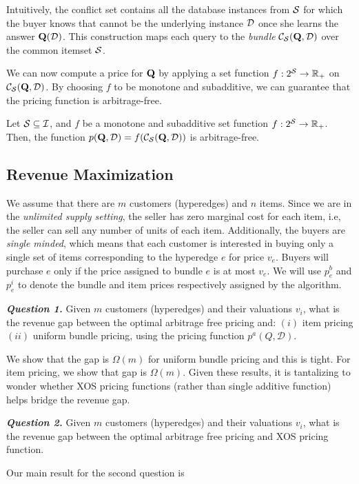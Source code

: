 Intuitively, the conflict set contains all the database instances from $\mathcal{S}$ for which the buyer knows that cannot be the underlying instance $\mathcal{D}$ once she learns the answer $\mathbf{Q}(\mathcal{D})$. This construction maps each query to the {\em  bundle} ${\mathcal{C}}_{\mathcal{S}}(\mathbf{Q},\mathcal{D}) $ over the common itemset $\mathcal{S}$.

We can now compute a price for $\mathbf{Q}$ by applying a set function $f: 2^{\mathcal{S}} \rightarrow  \mathbb{R}_+$ on ${\mathcal{C}}_{\mathcal{S}}(\mathbf{Q}, \mathcal{D})$. 
By choosing $f$ to be monotone and subadditive, we can guarantee that the pricing function is arbitrage-free.

\begin{theorem} \label{cor:arbitrage}
Let $\mathcal{S} \subseteq \mathcal{I}$, and $f$ be a monotone and subadditive set function $f: 2^{\mathcal{S}} \rightarrow  \mathbb{R}_+$. Then, the function $p(\mathbf{Q}, \mathcal{D}) = f({\mathcal{C}}_{\mathcal{S}}(\mathbf{Q}, \mathcal{D}))$ is arbitrage-free.
\end{theorem}

\subsection{Revenue Maximization}

We assume that there are $m$ customers (hyperedges) and $n$ items. Since we are in the {\em unlimited supply setting}, the seller has zero marginal cost  for each item, i.e, the seller can sell any number of units of each item. Additionally, the buyers are  {\em single minded}, which means that each customer is interested in buying only a single set of items corresponding to the hyperedge $e$ for price $v_e$. Buyers will purchase $e$ only if the price assigned to bundle $e$ is at most $v_e$. We will use $p^{b}_e$ and $p^{i}_e$ to denote the bundle and item prices respectively assigned by the algorithm. 




\textbf{\textit{Question 1.}} Given $m$ customers (hyperedges) and their valuations $v_i$, what is the revenue gap between the optimal arbitrage free pricing and: $(i)$ item pricing $(ii)$ uniform bundle pricing, using the pricing function $p^{a}(Q,\mathcal{D})$.

\vspace{1em}
We show that the gap is $\Omega(m)$ for uniform bundle pricing and this is tight. For item pricing, we show that gap is $\Omega(m)$. Given these results, it is tantalizing to wonder whether XOS pricing functions (rather than single additive function) helps bridge the revenue gap. 

\vspace{1em}
\textbf{\textit{Question 2.}} Given $m$ customers (hyperedges) and their valuations $v_i$, what is the revenue gap between the optimal arbitrage free pricing and XOS pricing function.

\vspace{1em}
Our main result for the second question is 
